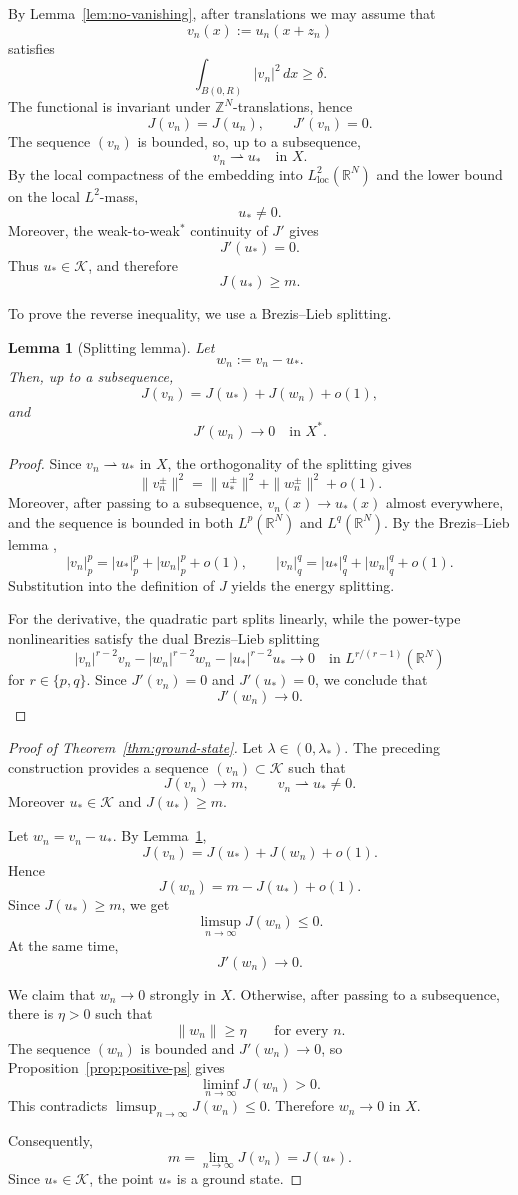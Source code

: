 \documentclass[11pt]{amsart}
\numberwithin{equation}{section}
\newtheorem{lemma}[theorem]{Lemma}
\theoremstyle{definition}
\newcommand{\R}{\mathbb{R}}
\newcommand{\Z}{\mathbb{Z}}
\newcommand{\cK}{\mathcal{K}}
\newcommand{\weak}{\rightharpoonup}
\begin{document}
By Lemma~\ref{lem:no-vanishing}, after translations we may assume that
\[
v_n(x):=u_n(x+z_n)
\]
satisfies
\[
\int_{B(0,R)}|v_n|^2\,dx\ge\delta.
\]
The functional is invariant under $\Z^{N}$-translations, hence
\[
J(v_n)=J(u_n),\qquad J'(v_n)=0.
\]
The sequence $(v_n)$ is bounded, so, up to a subsequence,
\[
v_n\weak u_*\quad\text{in }X.
\]
By the local compactness of the embedding into $L^2_{\mathrm{loc}}(\R^N)$ and
the lower bound on the local $L^2$-mass,
\[
u_*\ne0.
\]
Moreover, the weak-to-weak$^*$ continuity of $J'$ gives
\[
J'(u_*)=0.
\]
Thus $u_*\in\cK$, and therefore
\[
J(u_*)\ge m.
\]

To prove the reverse inequality, we use a Brezis--Lieb splitting.

\begin{lemma}[Splitting lemma]\label{lem:splitting}
Let
\[
w_n:=v_n-u_*.
\]
Then, up to a subsequence,
\[
J(v_n)=J(u_*)+J(w_n)+o(1),
\]
and
\[
J'(w_n)\to0\quad\text{in }X^*.
\]
\end{lemma}

\begin{proof}
Since $v_n\weak u_*$ in $X$, the orthogonality of the splitting gives
\[
\|v_n^\pm\|^2=\|u_*^\pm\|^2+\|w_n^\pm\|^2+o(1).
\]
Moreover, after passing to a subsequence, $v_n(x)\to u_*(x)$ almost
everywhere, and the sequence is bounded in both $L^p(\R^N)$ and $L^q(\R^N)$. By the Brezis--Lieb lemma \cite{BrezisLieb},
\[
|v_n|_p^p=|u_*|_p^p+|w_n|_p^p+o(1),
\qquad
|v_n|_q^q=|u_*|_q^q+|w_n|_q^q+o(1).
\]
Substitution into the definition of $J$ yields the energy splitting.

For the derivative, the quadratic part splits linearly, while the
power-type nonlinearities satisfy the dual Brezis--Lieb splitting
\[
|v_n|^{r-2}v_n-|w_n|^{r-2}w_n-|u_*|^{r-2}u_*
\to0
\quad\text{in }L^{r/(r-1)}(\R^N)
\]
for $r\in\{p,q\}$. Since $J'(v_n)=0$ and $J'(u_*)=0$, we conclude that
\[
J'(w_n)\to0.
\]
\end{proof}

\begin{proof}[Proof of Theorem~\ref{thm:ground-state}]
Let $\lambda\in(0,\lambda_*)$. The preceding construction provides a
sequence $(v_n)\subset\cK$ such
that
\[
J(v_n)\to m,\qquad v_n\weak u_*\ne0.
\]
Moreover $u_*\in\cK$ and $J(u_*)\ge m$.

Let $w_n=v_n-u_*$. By Lemma~\ref{lem:splitting},
\[
J(v_n)=J(u_*)+J(w_n)+o(1).
\]
Hence
\[
J(w_n)=m-J(u_*)+o(1).
\]
Since $J(u_*)\ge m$, we get
\[
\limsup_{n\to\infty}J(w_n)\le0.
\]
At the same time,
\[
J'(w_n)\to0.
\]

We claim that $w_n\to0$ strongly in $X$. Otherwise, after passing to a
subsequence, there is $\eta>0$ such that
\[
\|w_n\|\ge\eta
\qquad\text{for every }n.
\]
The sequence $(w_n)$ is bounded and $J'(w_n)\to0$, so Proposition~\ref{prop:positive-ps} gives
\[
\liminf_{n\to\infty}J(w_n)>0.
\]
This contradicts $\limsup_{n\to\infty} J(w_n)\le0$. Therefore $w_n\to0$ in $X$.

Consequently,
\[
m=\lim_{n\to\infty}J(v_n)=J(u_*).
\]
Since $u_*\in\cK$, the point $u_*$ is a ground state.
\end{proof}
\end{document}
